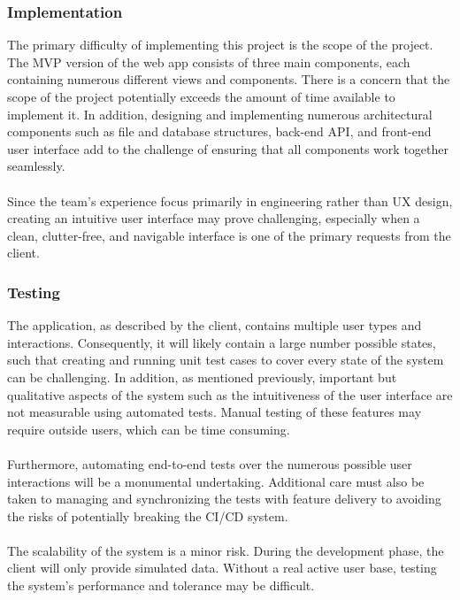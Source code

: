 \documentclass{article}
\begin{document}
\subsubsection{Implementation}
The primary difficulty of implementing this project is the scope of the
project. The MVP version of the web app consists of three main components, each
containing numerous different views and components. There is a concern that the
scope of the project potentially exceeds the amount of time available to
implement it. In addition, designing and implementing numerous architectural
components such as file and database structures, back-end API, and front-end
user interface add to the challenge of ensuring that all components work
together seamlessly.\\

\\Since the team's experience focus primarily in engineering rather than UX
design, creating an intuitive user interface may prove challenging, especially
when a clean, clutter-free, and navigable interface is one of the primary
requests from the client.

\subsubsection{Testing}
The application, as described by the client, contains multiple user types and
interactions. Consequently, it will likely contain a large number possible
states, such that creating and running unit test cases to cover every state of
the system can be challenging. In addition, as mentioned previously, important
but qualitative aspects of the system such as the intuitiveness of the user
interface are not measurable using automated tests. Manual testing of these
features may require outside users, which can be time consuming.\\

\\Furthermore, automating end-to-end tests over the numerous possible user
interactions will be a monumental undertaking. Additional care must also be
taken to managing and synchronizing the tests with feature delivery to
avoiding the risks of potentially breaking the CI/CD system.\\

\\The scalability of the system is a minor risk. During the development phase,
the client will only provide simulated data. Without a real active user base,
testing the system's performance and tolerance may be difficult.
\end{document}
